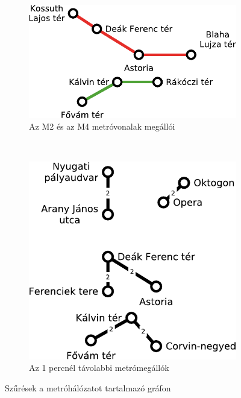 \begin{figure}[H]
	\begin{subfigure}[b]{0.5\textwidth}
		\centering
		\includegraphics[scale=\yedscale]{metrohalozat-nagykorut-elcimkezett-szurt}
		\caption{Az M2 és az M4 metróvonalak megállói}
		\label{fig:metrohalozat-nagykorut-elcimkezett-szurt}
	\end{subfigure}
	~
	\begin{subfigure}[b]{0.5\textwidth}
		\centering
		\includegraphics[scale=\yedscale]{metrohalozat-nagykorut-elsulyozott-szurt}
		\caption{Az 1 percnél távolabbi metrómegállók}
		\label{fig:metrohalozat-nagykorut-elsulyozott-szurt}
	\end{subfigure}
	\caption{Szűrések a metróhálózatot tartalmazó gráfon}
\end{figure}


